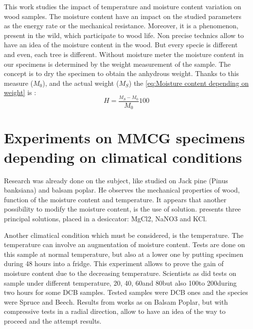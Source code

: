 This work studies the impact of temperature and moisture content variation on wood samples. The moisture content have an impact on the studied parameters as the energy rate or the mechanical resistance. Moreover, it is a phenomenon, present in the wild, which participate to wood life. Non precise technics allow to have an idea of the moisture content in the wood. But every specie is different and even, each tree is different. 
Without moisture meter the moisture content in our specimens is determined by the weight measurement of the sample. The concept is to dry the specimen to obtain the anhydrous weight. Thanks to this measure ($M_{0}$), and the actual weight ($M_{S}$) the \ref{eq:Moisture content depending on weight} is :
\begin{equation}
	H=\frac{_{M_{S}-M_{0}}}{M_{0}}100
	\label{eq:Moisture content depending on weight}
\end{equation} 


\section{Experiments on MMCG specimens depending on climatical conditions}

Research was already done on the subject, like \parencite{Reference12} studied on Jack pine (Pinus banksiana) and balsam poplar. He observes the mechanical properties of wood, function of the moisture content and temperature. It appears that another possibility to modify the moisture content, is the use of solution. \parencite{Reference12} presents three principal solutions, placed in a desiccator: MgCl2, NaNO3 and KCl. 

Another climatical condition which must be considered, is the temperature. The temperature can involve an augmentation of moisture content. Tests are done on this sample at normal temperature, but also at a lower one by putting specimen during 48 hours into a fridge. This experiment allows to prove the gain of moisture content due to the decreasing temperature. Scientists as \parencite{Reference13} did tests on sample under different temperature, 20\textcelsius, 40\textcelsius, 60\textcelsius and 80\textcelsius but also 100\textcelsius to 200\textcelsius during two hours for some DCB samples.
Tested samples were DCB ones and the species were Spruce and Beech. Results from works as \parencite{Reference12} on Balsam Poplar, but with compressive tests in a radial direction, allow to have an idea of the way to proceed and the attempt results. 

